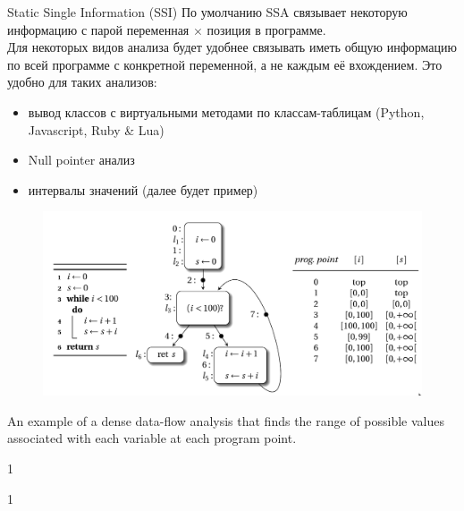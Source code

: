 \documentclass[aspectratio=169
  , xcolor={svgnames}
  , hyperref={ colorlinks,citecolor=DeepPink4
             , linkcolor=DarkRed,urlcolor=DarkBlue}
  , russian
  ]{beamer}
\theoremstyle{exerciseStyle1}
\begin{document}
\begin{frame}[fragile]{Static Single Information (SSI)}
По умолчанию SSA связывает некоторую информацию с парой переменная $\times$ позиция в программе.\\

Для некоторых видов анализа будет удобнее связывать иметь общую информацию по всей программе с конкретной переменной, а не каждым её вхождением. Это удобно для таких анализов:
\begin{itemize}
\item вывод классов с виртуальными методами по классам-таблицам (Python, Javascript, Ruby \& Lua)
\item Null pointer анализ
\item интервалы значений (далее будет пример)
\end{itemize}
\end{frame}



\begin{frame}[fragile]{}
\begin{figure}
\centering
\includegraphics[height=.85\textheight]{figures/dense-range-analysis}
\end{figure}
An example of a dense data-flow analysis that finds the range of possible values associated
with each variable at each program point.

\end{frame}


\begin{frame}[fragile]{}
1
\end{frame}

\begin{frame}[fragile]{}
1
\end{frame}
\end{document}

